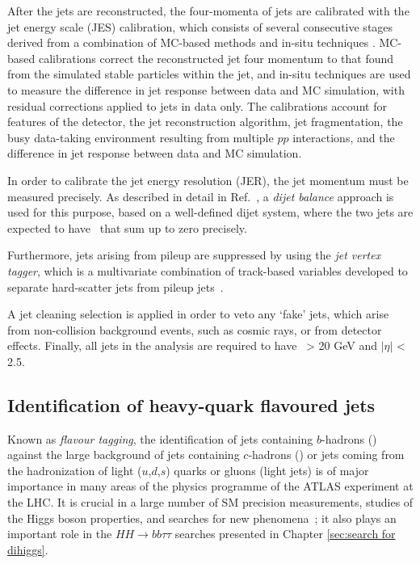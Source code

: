 After the jets are reconstructed, the four-momenta of jets
are calibrated with the jet energy scale (JES) calibration,
which consists of several consecutive stages derived from a
combination of MC-based methods and in-situ techniques \cite{PERF-2016-04}.
MC-based calibrations correct the reconstructed jet four momentum 
to that found from the simulated stable particles 
within the jet, and in-situ techniques are used to measure 
the difference in jet response between data and
MC simulation, with residual corrections applied to jets in data only.
The calibrations account for features of the
detector, the jet reconstruction algorithm, jet fragmentation,
the busy data-taking environment resulting from multiple $pp$ 
interactions, and the difference in jet response between
data and MC simulation.


In order to calibrate the jet energy resolution (JER),
the jet momentum must be measured precisely. 
As described in detail in Ref.~\cite{JETM-2018-05},
a \textit{dijet balance} approach is used for this purpose,
based on a well-defined dijet system,
where the two jets are expected to have \pt\ that 
sum up to zero precisely.


Furthermore, jets arising from pileup are suppressed by using the 
\textit{jet vertex tagger}, which is a multivariate 
combination of track-based variables developed to separate 
hard-scatter jets from pileup jets~\cite{ATLAS-CONF-2014-018}.


A jet cleaning selection is applied in order to veto any `fake' jets, 
which arise from non-collision background events, such as cosmic rays, 
or from detector effects. 
Finally, all jets in the analysis are required to have \pt\ > 20 GeV 
and $|\eta|$ < 2.5.


\subsection{Identification of heavy-quark flavoured jets}
\label{sec:Flavour tagging}
Known as \textit{flavour tagging}, 
the identification of jets containing $b$-hadrons (\bjets) 
against the large background of jets containing $c$-hadrons 
(\cjets) or jets coming from the hadronization of light ($u$,$d$,$s$) 
quarks or gluons (light jets) is of major importance in many areas of the 
physics programme of the ATLAS experiment at the LHC. 
It is crucial in a large number of SM
precision measurements, studies of the Higgs boson properties, and 
searches for 
new phenomena~\cite{SUSY-2014-08, ATLAS-CONF-2018-043,Interpreting_Higgs_result};
it also plays an important role in 
the $HH \to bb\tau\tau$ searches 
presented in Chapter \ref{sec:search for dihiggs}. 

